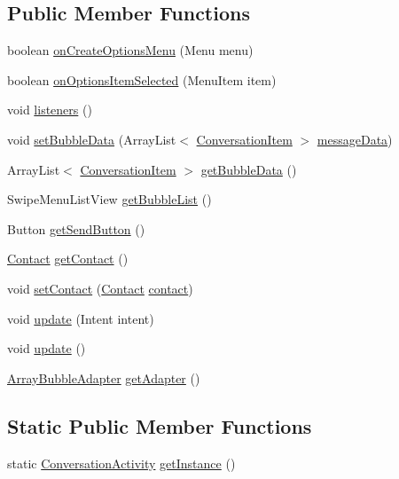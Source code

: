 \subsection*{Public Member Functions}
\begin{DoxyCompactItemize}
\item 
boolean \hyperlink{a00006_a8f7d87763ddaf085205a54e8477ecfce}{on\+Create\+Options\+Menu} (Menu menu)
\item 
boolean \hyperlink{a00006_a37a55c533c74b60c0290ef1329d74e65}{on\+Options\+Item\+Selected} (Menu\+Item item)
\item 
void \hyperlink{a00006_a92b8e0730130e1184a8cdbd89590779d}{listeners} ()
\item 
void \hyperlink{a00006_a1e3fee8580ec4092ffc6e3ce9d44f2b9}{set\+Bubble\+Data} (Array\+List$<$ \hyperlink{a00007}{Conversation\+Item} $>$ \hyperlink{a00006_a68544a0bda28776dfb51718a3c71bf69}{message\+Data})
\item 
Array\+List$<$ \hyperlink{a00007}{Conversation\+Item} $>$ \hyperlink{a00006_ac8e14177e6079becbb8bc1f8b35197e0}{get\+Bubble\+Data} ()
\item 
Swipe\+Menu\+List\+View \hyperlink{a00006_af293d3ea5f145650e06a96d2bae482da}{get\+Bubble\+List} ()
\item 
Button \hyperlink{a00006_a57576f3fc93bfa5a685ed5ee30fe113c}{get\+Send\+Button} ()
\item 
\hyperlink{a00005}{Contact} \hyperlink{a00006_adb647c7ae09f1d5755db63d701968925}{get\+Contact} ()
\item 
void \hyperlink{a00006_abef3c7b6635dc06ac6b8e4b37c51b37f}{set\+Contact} (\hyperlink{a00005}{Contact} \hyperlink{a00006_a3459849ab29ad684658dbcd0cf8c5d5a}{contact})
\item 
void \hyperlink{a00006_aa2825578f585a8a32958eaf0ce8df7b8}{update} (Intent intent)
\item 
void \hyperlink{a00006_ac5c54df7ed3b930268c8d7752c101725}{update} ()
\item 
\hyperlink{a00002}{Array\+Bubble\+Adapter} \hyperlink{a00006_a06738816ea7799569af8fa119bb49f7e}{get\+Adapter} ()
\end{DoxyCompactItemize}
\subsection*{Static Public Member Functions}
\begin{DoxyCompactItemize}
\item 
static \hyperlink{a00006}{Conversation\+Activity} \hyperlink{a00006_a7ebafa56e442a2f16c4afe044e65695b}{get\+Instance} ()
\end{DoxyCompactItemize}
